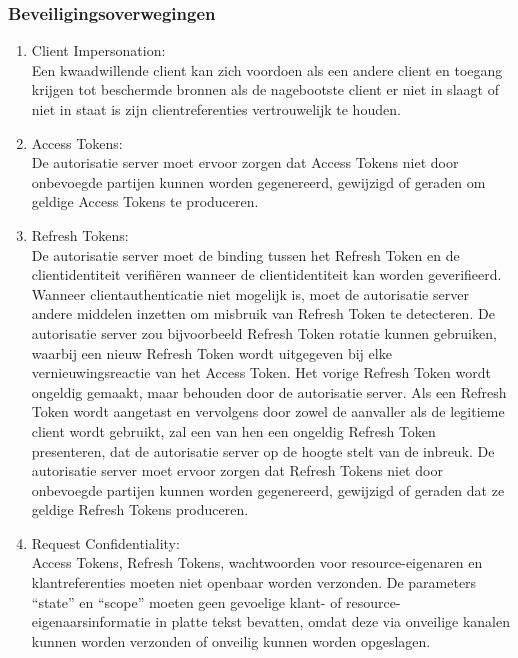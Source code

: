   \subsubsection{Beveiligingsoverwegingen}
  \label{subsubsec:beveiligingsoverwegingen}
  \begin{enumerate}[label=\textbf{-}]
      \item Client Impersonation: \\
      Een kwaadwillende client kan zich voordoen als een andere client en toegang krijgen tot beschermde bronnen als de nagebootste client er niet in slaagt of niet in staat is zijn clientreferenties vertrouwelijk te houden.
  
      \item Access Tokens: \\
      De autorisatie server moet ervoor zorgen dat Access Tokens niet door onbevoegde partijen kunnen worden gegenereerd, gewijzigd of geraden om geldige Access Tokens te produceren.
  
      \item Refresh Tokens: \\
      De autorisatie server moet de binding tussen het Refresh Token en de clientidentiteit verifiëren wanneer de clientidentiteit kan worden geverifieerd. Wanneer clientauthenticatie niet mogelijk is, moet de autorisatie server andere middelen inzetten om misbruik van Refresh Token te detecteren. De autorisatie server zou bijvoorbeeld Refresh Token rotatie kunnen gebruiken, waarbij een nieuw Refresh Token wordt uitgegeven bij elke vernieuwingsreactie van het Access Token. Het vorige Refresh Token wordt ongeldig gemaakt, maar behouden door de autorisatie server. Als een Refresh Token wordt aangetast en vervolgens door zowel de aanvaller als de legitieme client wordt gebruikt, zal een van hen een ongeldig Refresh Token presenteren, dat de autorisatie server op de hoogte stelt van de inbreuk. De autorisatie server moet ervoor zorgen dat Refresh Tokens niet door onbevoegde partijen kunnen worden gegenereerd, gewijzigd of geraden dat ze geldige Refresh Tokens produceren.
  
      \item Request Confidentiality: \\
      Access Tokens, Refresh Tokens, wachtwoorden voor resource-eigenaren en klantreferenties moeten niet openbaar worden verzonden. De parameters ``state'' en ``scope'' moeten geen gevoelige klant- of resource-eigenaarsinformatie in platte tekst bevatten, omdat deze via onveilige kanalen kunnen worden verzonden of onveilig kunnen worden opgeslagen.
  \end{enumerate}


